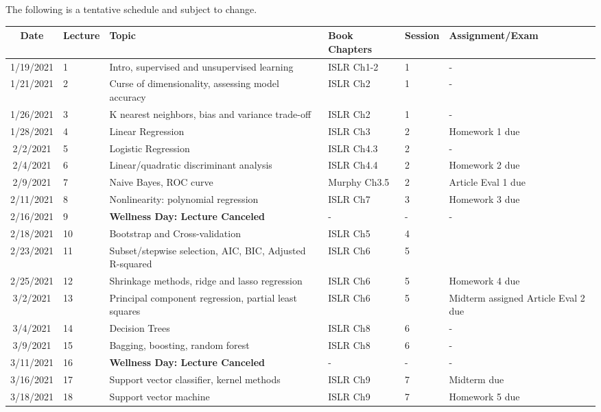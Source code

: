\documentclass[11pt]{article}
\begin{document}
The following is a tentative schedule and subject to change.
\begin{center}
\begin{tabular}{c|m{3em}|m{21em}|m{7em}|m{3em}|m{8em}}
Date & Lecture & Topic & Book Chapters & Session & Assignment/Exam\\
\hline
1/19/2021 & 1 & Intro, supervised and unsupervised learning & ISLR Ch1-2 &  1 & - \\ \hline
1/21/2021 & 2 & Curse of dimensionality, assessing model accuracy & ISLR Ch2 &  1 & - \\ \hline
1/26/2021 & 3 & K nearest neighbors, bias and variance trade-off  & ISLR Ch2 &  1 & - \\ \hline
1/28/2021 & 4 & Linear Regression & ISLR Ch3 &  2 & Homework 1 due \\ \hline
2/2/2021 & 5 & Logistic Regression & ISLR Ch4.3 &  2 & - \\ \hline
2/4/2021 & 6 & Linear/quadratic discriminant analysis & ISLR Ch4.4 &  2 & Homework 2 due \\ \hline
2/9/2021 & 7 & Naive Bayes, ROC curve & Murphy Ch3.5 &  2 & Article Eval 1 due \\ \hline
2/11/2021 & 8 & Nonlinearity: polynomial regression & ISLR Ch7 & 3 & Homework 3 due \\ \hline
2/16/2021 & 9 & \textbf{Wellness Day: Lecture Canceled} & - & - & -\\ \hline
2/18/2021 & 10 & Bootstrap and Cross-validation & ISLR Ch5 &  4 & \\ \hline
2/23/2021 & 11 &  Subset/stepwise selection, AIC, BIC, Adjusted R-squared & ISLR Ch6 &  5 & \\ \hline
2/25/2021 & 12 & Shrinkage methods, ridge and lasso regression & ISLR Ch6 & 5 & Homework 4 due \\ \hline
3/2/2021 & 13 & Principal component regression, partial least squares & ISLR Ch6 & 5 & Midterm assigned Article Eval 2 due\\ \hline
3/4/2021 & 14 & Decision Trees & ISLR Ch8 & 6 & - \\ \hline
3/9/2021 & 15 & Bagging, boosting, random forest & ISLR Ch8 & 6 & - \\ \hline
3/11/2021 & 16 & \textbf{Wellness Day: Lecture Canceled} & - & - & - \\ \hline
3/16/2021 & 17 & Support vector classifier, kernel methods & ISLR Ch9 & 7 & Midterm due \\ \hline
3/18/2021 & 18 & Support vector machine & ISLR Ch9 &  7 & Homework 5 due\\ \hline

\end{tabular}
\end{center}
\end{document}
